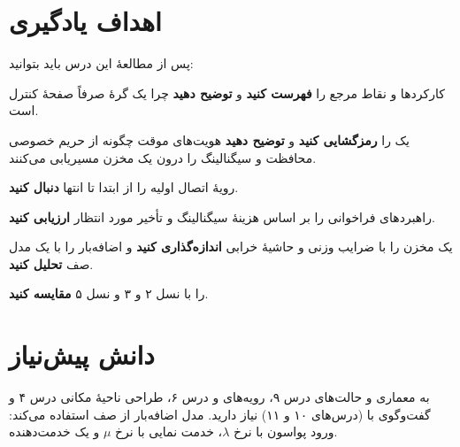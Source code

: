 \documentclass[11pt,a4paper]{article}
\begin{document}
\ACNcover

\section{اهداف یادگیری}
پس از مطالعهٔ این درس باید بتوانید:
\begin{objectives}
  \item کارکردها و نقاط مرجع  را \textbf{فهرست کنید} و \textbf{توضیح دهید} چرا یک گرهٔ صرفاً صفحهٔ کنترل است.
  \item یک  را \textbf{رمزگشایی کنید} و \textbf{توضیح دهید} هویت‌های موقت چگونه از حریم خصوصی محافظت و
        سیگنالینگ را درون یک مخزن  مسیریابی می‌کنند.
  \item رویهٔ اتصال اولیه را از ابتدا تا انتها \textbf{دنبال کنید}.
  \item راهبردهای فراخوانی را بر اساس هزینهٔ سیگنالینگ و تأخیر مورد انتظار \textbf{ارزیابی کنید}.
  \item یک مخزن  را با ضرایب وزنی و حاشیهٔ خرابی \textbf{اندازه‌گذاری کنید} و اضافه‌بار  را با یک مدل صف
        \textbf{تحلیل کنید}.
  \item {} را با  نسل ۲ و ۳ و  نسل ۵ \textbf{مقایسه کنید}.
\end{objectives}

\section{دانش پیش‌نیاز}
به معماری  و حالت‌های  درس ۹، رویه‌های  و  درس ۶، طراحی ناحیهٔ مکانی درس ۴
و گفت‌وگوی  با  (درس‌های ۱۰ و ۱۱) نیاز دارید. مدل اضافه‌بار از صف  استفاده می‌کند: ورود
پواسون با نرخ $\lambda$، خدمت نمایی با نرخ $\mu$ و یک خدمت‌دهنده.
\end{document}
